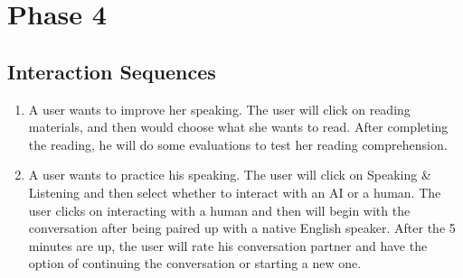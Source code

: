 \documentclass{sigchi}
\newcommand\tabhead[1]{\small\textbf{#1}}
\begin{document}



\section{Phase 4}


\subsection{Interaction Sequences}
\begin{enumerate}
\item A user wants to improve her speaking. The user will click on reading materials, and then would choose what she wants to read. After completing the reading, he will do some evaluations to test her reading comprehension.
\item A user wants to practice his speaking. The user will click on Speaking & Listening and then select whether to interact with an AI or a human. The user clicks on interacting with a human and then will begin with the conversation after being paired up with a native English speaker. After the 5 minutes are up, the user will rate his conversation partner and have the option of continuing the conversation or starting a new one.
\end{enumerate}
\end{document}

